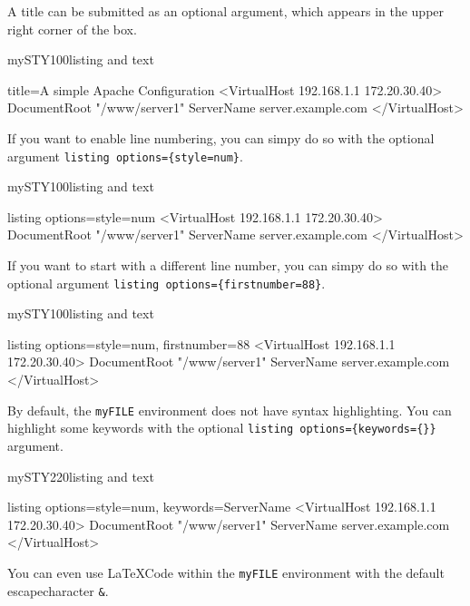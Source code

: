 \documentclass[]{myHOWTO-V001}
\begin{document}
A title can be submitted as an optional argument, which appears in the upper right corner of the box.

\begin{myTEXEXdoclst}{mySTY100}{listing and text}
\begin{myFILE}{title={A simple Apache Configuration}}
<VirtualHost 192.168.1.1 172.20.30.40>
	DocumentRoot "/www/server1"
	ServerName server.example.com
</VirtualHost>
\end{myFILE}
\end{myTEXEXdoclst}

If you want to enable line numbering, you can simpy do so with the optional argument \verb|listing options={style=num}|.

\begin{myTEXEXdoclst}{mySTY100}{listing and text}
\begin{myFILE}{listing options={style=num}}
<VirtualHost 192.168.1.1 172.20.30.40>
	DocumentRoot "/www/server1"
	ServerName server.example.com
</VirtualHost>
\end{myFILE}
\end{myTEXEXdoclst}

If you want to start with a different line number, you can simpy do so with the optional argument \verb|listing options={firstnumber=88}|.

\begin{myTEXEXdoclst}{mySTY100}{listing and text}
\begin{myFILE}{listing options={style=num, firstnumber=88}}
<VirtualHost 192.168.1.1 172.20.30.40>
	DocumentRoot "/www/server1"
	ServerName server.example.com
</VirtualHost>
\end{myFILE}
\end{myTEXEXdoclst}

By default, the \Verb|myFILE| environment does not have syntax highlighting. You can highlight some keywords with the optional \verb|listing options={keywords={}}| argument.

\begin{myTEXEXdoclst}{mySTY220}{listing and text}
\begin{myFILE}{listing options={style=num, keywords={ServerName}}}
<VirtualHost 192.168.1.1 172.20.30.40>
	DocumentRoot "/www/server1"
	ServerName server.example.com
</VirtualHost>
\end{myFILE}
\end{myTEXEXdoclst}

You can even use \LaTeX Code within the \Verb|myFILE| environment with the default escapecharacter \Verb|&|.
\end{document}
